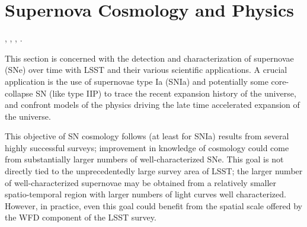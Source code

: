 %
%
%

\section{Supernova Cosmology and Physics}
\def\secname{supernovae}\label{sec:\secname}

,
,
,
.

This section is concerned with the detection and characterization of
supernovae (SNe) over time with LSST and their various scientific
applications. A crucial application is the use of supernovae type
Ia (SNIa) and potentially some core-collapse SN (like type IIP) to trace
the recent expansion history of the universe, and confront models of the
physics driving the late time accelerated expansion of the universe.

This objective of SN cosmology follows (at least for SNIa) results from
several highly successful surveys; improvement in knowledge of cosmology
could come from substantially larger numbers of well-characterized SNe.
This goal is not directly tied to the unprecedentedly large survey area of
LSST; the larger number of well-characterized supernovae may be obtained from
a relatively smaller spatio-temporal region with larger numbers of light curves
well characterized. However, in practice, even this goal could
benefit from the spatial scale offered by the WFD component of the LSST
survey.

